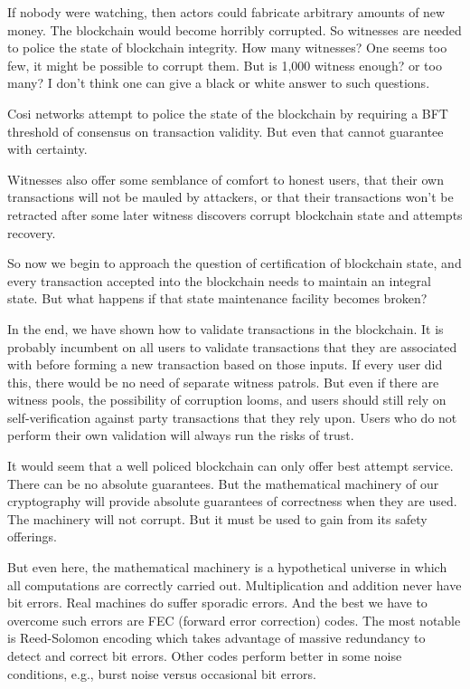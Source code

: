 \documentclass[a4paper, 10pt, conference]{ieeeconf}
\begin{document}
If nobody were watching, then actors could fabricate arbitrary amounts of new money. The blockchain would become horribly corrupted. So witnesses are needed to police the state of blockchain integrity. How many witnesses? One seems too few, it might be possible to corrupt them. But is 1,000 witness enough? or too many? I don't think one can give a black or white answer to such questions.

Cosi networks attempt to police the state of the blockchain by requiring a BFT threshold of consensus on transaction validity. But even that cannot guarantee with certainty. 

Witnesses also offer some semblance of comfort to honest users, that their own transactions will not be mauled by attackers, or that their transactions won't be retracted after some later witness discovers corrupt blockchain state and attempts recovery.

So now we begin to approach the question of certification of blockchain state, and every transaction accepted into the blockchain needs to maintain an integral state. But what happens if that state maintenance facility becomes broken?

In the end, we have shown how to validate transactions in the blockchain. It is probably incumbent on all users to validate transactions that they are associated with before forming a new transaction based on those inputs. If every user did this, there would be no need of separate witness patrols. But even if there are witness pools, the possibility of corruption looms, and users should still rely on self-verification against party transactions that they rely upon. Users who do not perform their own validation will always run the risks of trust.

It would seem that a well policed blockchain can only offer best attempt service. There can be no absolute guarantees. But the mathematical machinery of our cryptography will provide absolute guarantees of correctness when they are used. The machinery will not corrupt. But it must be used to gain from its safety offerings.

But even here, the mathematical machinery is a hypothetical universe in which all computations are correctly carried out. Multiplication and addition never have bit errors. Real machines do suffer sporadic errors. And the best we have to overcome such errors are FEC (forward error correction) codes. The most notable is Reed-Solomon encoding which takes advantage of massive redundancy to detect and correct bit errors. Other codes perform better in some noise conditions, e.g., burst noise versus occasional bit errors.
\end{document}
